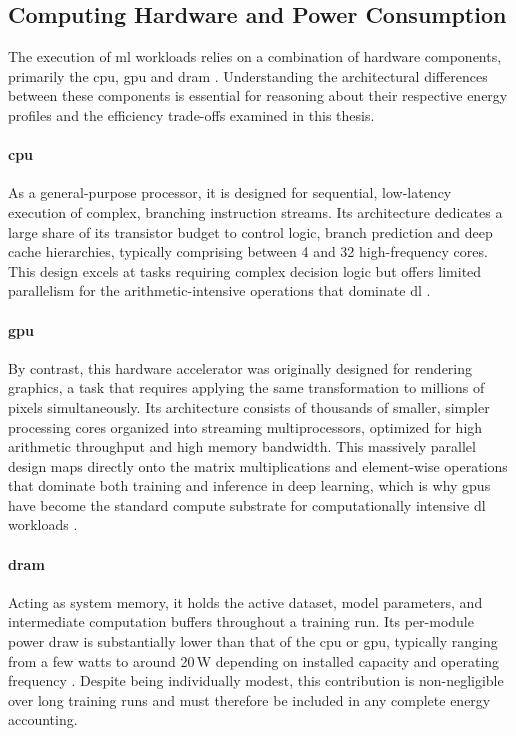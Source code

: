 \subsection{Computing Hardware and Power Consumption}
\label{sec:theoretical_hardware}

The execution of \gls{ml} workloads relies on a combination of hardware components, primarily the \gls{cpu}, \gls{gpu} and \gls{dram} \parencite{hendersonSystematicReportingEnergy2020}. Understanding the architectural differences between these components is essential for reasoning about their respective energy profiles and the efficiency trade-offs examined in this thesis.

\paragraph{\gls{cpu}} As a general-purpose processor, it is designed for sequential, low-latency execution of complex, branching instruction streams. Its architecture dedicates a large share of its transistor budget to control logic, branch prediction and deep cache hierarchies, typically comprising between 4 and 32 high-frequency cores. This design excels at tasks requiring complex decision logic but offers limited parallelism for the arithmetic-intensive operations that dominate \gls{dl} \parencite{nickollsGPUComputingEra2010}.

\paragraph{\gls{gpu}} By contrast, this hardware accelerator was originally designed for rendering graphics, a task that requires applying the same transformation to millions of pixels simultaneously. Its architecture consists of thousands of smaller, simpler processing cores organized into streaming multiprocessors, optimized for high arithmetic throughput and high memory bandwidth. This massively parallel design maps directly onto the matrix multiplications and element-wise operations that dominate both training and inference in deep learning, which is why \glspl{gpu} have become the standard compute substrate for computationally intensive \gls{dl} workloads \parencite{dodgeMeasuringCarbonIntensity2022}.

\paragraph{\Gls{dram}} Acting as system memory, it holds the active dataset, model parameters, and intermediate computation buffers throughout a training run. Its per-module power draw is substantially lower than that of the \gls{cpu} or \gls{gpu}, typically ranging from a few watts to around 20\,W depending on installed capacity and operating frequency \parencite{khanRAPLActionExperiences2018}. Despite being individually modest, this contribution is non-negligible over long training runs and must therefore be included in any complete energy accounting.

